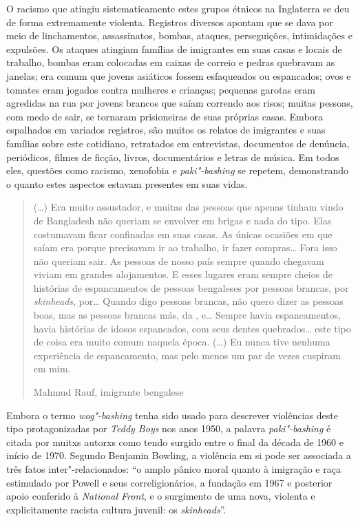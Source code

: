 O racismo que atingiu sistematicamente estes grupos étnicos na Inglaterra se deu de forma extremamente violenta. Registros diversos apontam que se dava por meio de linchamentos, assassinatos, bombas, ataques, perseguições, intimidações e expulsões. Os ataques atingiam famílias de imigrantes em suas casas e locais de trabalho, bombas eram colocadas em caixas de correio e pedras quebravam as janelas; era comum que jovens asiáticos fossem esfaqueados ou espancados; ovos e tomates eram jogados contra mulheres e crianças; pequenas garotas eram agredidas na rua por jovens brancos que saíam correndo aos risos; muitas pessoas, com medo de sair, se tornaram prisioneiras de suas próprias casas. Embora espalhados em variados registros, são muitos os relatos de imigrantes e suas famílias sobre este cotidiano, retratados em entrevistas, documentos de denúncia, periódicos, filmes de ficção, livros, documentários e letras de música. Em todos eles, questões como racismo, xenofobia e \emph{paki"-bashing} se repetem, demonstrando o quanto estes aspectos estavam presentes em suas vidas.

\begin{quote}
(\ldots{}) Era muito assustador, e muitas das pessoas que apenas tinham vindo de Bangladesh não queriam se envolver em brigas e nada do tipo. Elas costumavam ficar confinadas em suas casas. As únicas ocasiões em que saíam era porque precisavam ir ao trabalho, ir fazer compras\ldots{} Fora isso não queriam sair. As pessoas de nosso país sempre quando chegavam viviam em grandes alojamentos. E esses lugares eram sempre cheios de histórias de espancamentos de pessoas bengaleses por pessoas brancas, por \emph{skinheads}, por\ldots{} Quando digo pessoas brancas, não quero dizer as pessoas boas, mas as pessoas brancas más, da , e\ldots{} Sempre havia espancamentos, havia histórias de idosos espancados, com seus dentes quebrados\ldots{} este tipo de coisa era muito comum naquela época. (\ldots{}) Eu nunca tive nenhuma experiência de espancamento, mas pelo menos um par de vezes cuspiram em mim.

Mahmud Rauf, imigrante bengalese
\end{quote}

Embora o termo \emph{wog"-bashing} tenha sido usado para descrever violências deste tipo protagonizadas por \emph{Teddy Boys} nos anos 1950, a palavra \emph{paki"-bashing} é citada por muitxs autorxs como tendo surgido entre o final da década de 1960 e início de 1970. Segundo Benjamin Bowling, a violência em si pode ser associada a três fatos inter"-relacionados: ``o amplo pânico moral quanto à imigração e raça estimulado por Powell e seus correligionários, a fundação em 1967 e posterior apoio conferido à \emph{National Front}, e o surgimento de uma nova, violenta e explicitamente racista cultura juvenil: os \emph{skinheads}''.

